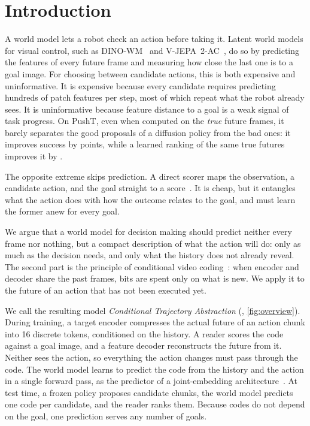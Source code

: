 \section{Introduction}
\label{sec:intro}

A world model lets a robot check an action before taking it.
Latent world models for visual control, such as DINO-WM~\cite{zhou2025dinowm} and V-JEPA~2-AC~\cite{assran2025vjepa2}, do so by predicting the features of every future frame and measuring how close the last one is to a goal image.
For choosing between candidate actions, this is both expensive and uninformative.
It is expensive because every candidate requires predicting hundreds of patch features per step, most of which repeat what the robot already sees.
It is uninformative because feature distance to a goal is a weak signal of task progress.
On PushT, even when computed on the \emph{true} future frames, it barely separates the good proposals of a diffusion policy from the bad ones: it improves success by  points, while a learned ranking of the same true futures improves it by .

The opposite extreme skips prediction.
A direct scorer maps the observation, a candidate action, and the goal straight to a score~\cite{nakamoto2024vgps}.
It is cheap, but it entangles what the action does with how the outcome relates to the goal, and must learn the former anew for every goal.

We argue that a world model for decision making should predict neither every frame nor nothing, but a compact description of what the action will do: only as much as the decision needs, and only what the history does not already reveal.
The second part is the principle of conditional video coding~\cite{li2021dcvc}: when encoder and decoder share the past frames, bits are spent only on what is new.
We apply it to the future of an action that has not been executed yet.

We call the resulting model \emph{Conditional Trajectory Abstraction} (\method, \cref{fig:overview}).
During training, a target encoder compresses the actual future of an action chunk into 16 discrete tokens, conditioned on the history.
A reader scores the code against a goal image, and a feature decoder reconstructs the future from it.
Neither sees the action, so everything the action changes must pass through the code.
The world model learns to predict the code from the history and the action in a single forward pass, as the predictor of a joint-embedding architecture~\cite{lecun2022path,assran2023ijepa}.
At test time, a frozen policy proposes candidate chunks, the world model predicts one code per candidate, and the reader ranks them.
Because codes do not depend on the goal, one prediction serves any number of goals.

